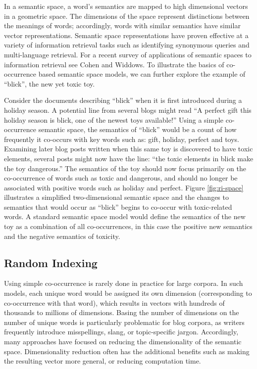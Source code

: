\documentclass[a4paper,twocolumn,twoside,10pt]{ranlp}
\begin{document}
In a semantic space, a word's semantics are mapped to high dimensional vectors
in a geometric space.  The dimensions of the space represent distinctions
between the meanings of words; accordingly, words with similar semantics have
similar vector representations.  Semantic space representations have proven
effective at a variety of information retrieval tasks such as identifying
synonymous queries\cite{schutze97cooccurrence} and multi-language
retrieval\cite{littman98automatic,vinokourov2002finding}.  For a recent survey
of applications of semantic spaces to information retrieval see Cohen and
Widdows\cite{cohen09empirical}.  To illustrate the basics of co-occurrence based
semantic space models, we can further explore the example of ``blick'', the new
yet toxic toy.

Consider the documents describing ``blick'' when it is first introduced during a
holiday season.  A potential line from several blogs might read ``A perfect gift
this holiday season is blick, one of the newest toys available!''  Using a
simple co-occurrence semantic space, the semantics of ``blick'' would be a count
of how frequently it co-occurs with key words such as: gift, holiday, perfect
and toys.  Examining later blog posts written when this same toy is discovered
to have toxic elements, several posts might now have the line: ``the toxic
elements in blick make the toy dangerous.'' The semantics of the toy should now
focus primarily on the co-occurrence of words such as toxic and dangerous, and
should no longer be associated with positive words such as holiday and perfect.
Figure \ref{fig:ri-space} illustrates a simplified two-dimensional semantic
space and the changes to semantics that would occur as ``blick'' begins to
co-occur with toxic-related words.  A standard semantic space model would define
the semantics of the new toy as a combination of all co-occurrences, in this
case the positive new semantics and the negative semantics of toxicity.

\subsection{Random Indexing}

Using simple co-occurrence is rarely done in practice for large corpora.  In
such models, each unique word would be assigned its own dimension (corresponding
to co-occurrence with that word), which results in vectors with hundreds of
thousands to millions of dimensions.  Basing the number of dimensions on the
number of unique words is particularly problematic for blog corpora, as writers
frequently introduce misspellings, slang, or topic-specific jargon.
Accordingly, many approaches have focused on reducing the dimensionality of the
semantic space.  Dimensionality reduction often has the additional benefits such
as making the resulting vector more general, or reducing computation time.
\end{document}

